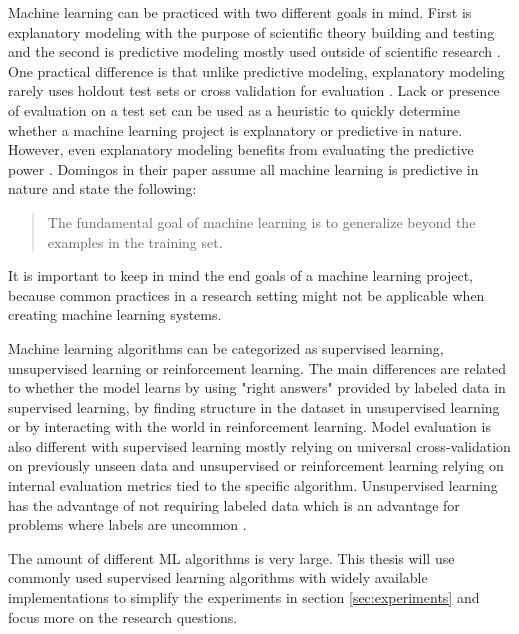Machine learning can be practiced with two different goals in mind. First is explanatory modeling with the purpose of scientific theory building and testing and the second is predictive modeling mostly used outside of scientific research \parencite{shmueliExplainPredict2010a}.
One practical difference is that unlike predictive modeling, explanatory modeling rarely uses holdout test sets or cross validation for evaluation \parencite{shmueliExplainPredict2010a}.
Lack or presence of evaluation on a test set can be used as a heuristic to quickly determine whether a machine learning project is explanatory or predictive in nature.
However, even explanatory modeling benefits from evaluating the predictive power \parencite{shmueliExplainPredict2010a}.
Domingos \parencite*{domingosFewUsefulThings2012} in their paper assume all machine learning is predictive in nature and state the following:
\begin{quote}
    The fundamental goal of machine learning is to generalize beyond the examples in the training set.
\end{quote}
It is important to keep in mind the end goals of a machine learning project, because common practices in a research setting might not be applicable when creating machine learning systems.

Machine learning algorithms can be categorized as supervised learning, unsupervised learning or reinforcement learning. %
The main differences are related to whether the model learns by using "right answers" provided by labeled data in supervised learning, by finding structure in the dataset in unsupervised learning or by interacting with the world in reinforcement learning. %
Model evaluation is also different with supervised learning mostly relying on universal cross-validation on previously unseen data and unsupervised or reinforcement learning relying on internal evaluation metrics tied to the specific algorithm. %
Unsupervised learning has the advantage of not requiring labeled data which is an advantage for problems where labels are uncommon \parencite{leBuildingHighlevelFeatures2012}.

The amount of different ML algorithms is very large. This thesis will use commonly used supervised learning algorithms with widely available implementations to simplify the experiments in section \ref{sec:experiments} and focus more on the research questions.

